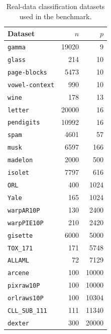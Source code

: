 \begin{table}[H]
  \centering
  \scriptsize
  \setlength{\tabcolsep}{5pt}
  \begin{tabular}{@{}lrr@{}}
    \toprule
    Dataset & $n$ & $p$ \\
    \midrule
    \nolinkurl{gamma} & 19020 & 9 \\
    \nolinkurl{glass} & 214 & 10 \\
    \nolinkurl{page-blocks} & 5473 & 10 \\
    \nolinkurl{vowel-context} & 990 & 10 \\
    \nolinkurl{wine} & 178 & 13 \\
    \nolinkurl{letter} & 20000 & 16 \\
    \nolinkurl{pendigits} & 10992 & 16 \\
    \nolinkurl{spam} & 4601 & 57 \\
    \nolinkurl{musk} & 6597 & 166 \\
    \nolinkurl{madelon} & 2000 & 500 \\
    \nolinkurl{isolet} & 7797 & 616 \\
    \nolinkurl{ORL} & 400 & 1024 \\
    \nolinkurl{Yale} & 165 & 1024 \\
    \nolinkurl{warpAR10P} & 130 & 2400 \\
    \nolinkurl{warpPIE10P} & 210 & 2420 \\
    \nolinkurl{gisette} & 6000 & 5000 \\
    \nolinkurl{TOX_171} & 171 & 5748 \\
    \nolinkurl{ALLAML} & 72 & 7129 \\
    \nolinkurl{arcene} & 100 & 10000 \\
    \nolinkurl{pixraw10P} & 100 & 10000 \\
    \nolinkurl{orlraws10P} & 100 & 10304 \\
    \nolinkurl{CLL_SUB_111} & 111 & 11340 \\
    \nolinkurl{dexter} & 300 & 20000 \\
    \bottomrule
  \end{tabular}
  \caption{Real-data classification datasets used in the benchmark.}
  \label{tab:real-dataset-inventory-clf}
\end{table}

